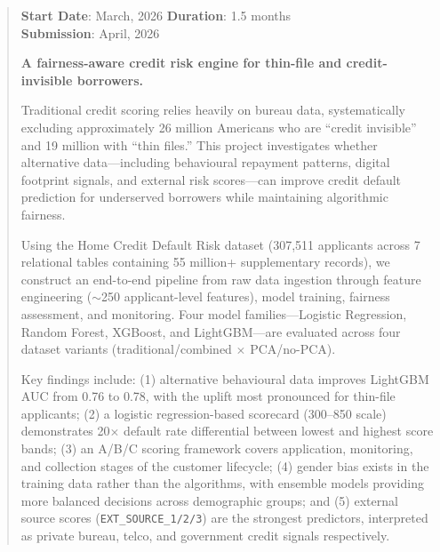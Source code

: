 
\begin{abstract}
\bigskip
\noindent
{\textbf{Start Date}: March, 2026}
\hfill
{\textbf{Duration}: 1.5 months}
\\
{\textbf{Submission}: April, 2026}
\bigskip \par
\begin{center}
\textbf{\large A fairness-aware credit risk engine for thin-file and credit-invisible borrowers.}
\end{center}
\par
Traditional credit scoring relies heavily on bureau data, systematically excluding approximately 26 million Americans who are ``credit invisible'' and 19 million with ``thin files.'' This project investigates whether alternative data---including behavioural repayment patterns, digital footprint signals, and external risk scores---can improve credit default prediction for underserved borrowers while maintaining algorithmic fairness.

Using the Home Credit Default Risk dataset (307,511 applicants across 7 relational tables containing 55 million+ supplementary records), we construct an end-to-end pipeline from raw data ingestion through feature engineering ($\sim$250 applicant-level features), model training, fairness assessment, and monitoring. Four model families---Logistic Regression, Random Forest, XGBoost, and LightGBM---are evaluated across four dataset variants (traditional/combined $\times$ PCA/no-PCA).

Key findings include: (1) alternative behavioural data improves LightGBM AUC from 0.76 to 0.78, with the uplift most pronounced for thin-file applicants; (2) a logistic regression-based scorecard (300--850 scale) demonstrates 20$\times$ default rate differential between lowest and highest score bands; (3) an A/B/C scoring framework covers application, monitoring, and collection stages of the customer lifecycle; (4) gender bias exists in the training data rather than the algorithms, with ensemble models providing more balanced decisions across demographic groups; and (5) external source scores (\texttt{EXT\_SOURCE\_1/2/3}) are the strongest predictors, interpreted as private bureau, telco, and government credit signals respectively.


\end{abstract}
